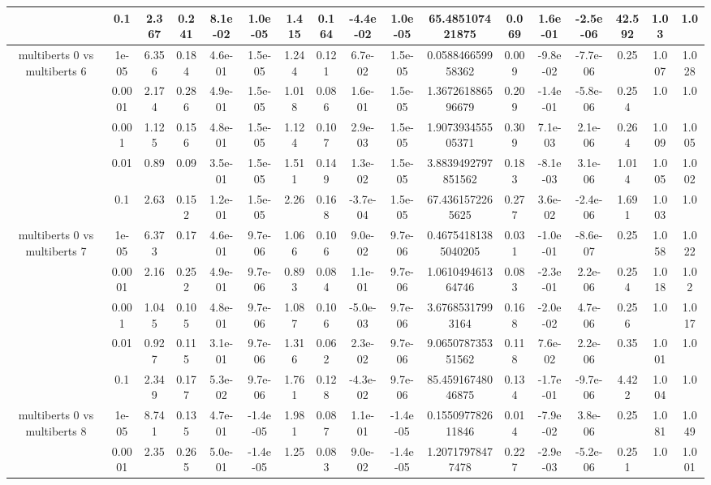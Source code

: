 \begin{tabular}{|c|c|c|c|c|c|c|c|c|c|c|c|c|c|c|c|c|}
 & 0.1 & 2.367 & 0.241 & 8.1e-02 & 1.0e-05 & 1.415 & 0.164 & -4.4e-02 & 1.0e-05 & 65.485107421875 & 0.069 & 1.6e-01 & -2.5e-06 & 42.592 & 1.03 & 1.0 \\
\hline
\multirow{5}{*}{multiberts 0 vs multiberts 6} & 1e-05 & 6.356 & 0.184 & 4.6e-01 & 1.5e-05 & 1.244 & 0.121 & 6.7e-02 & 1.5e-05 & 0.058846659958362 & 0.009 & -9.8e-02 & -7.7e-06 & 0.25 & 1.007 & 1.028 \\
 & 0.0001 & 2.174 & 0.286 & 4.9e-01 & 1.5e-05 & 1.018 & 0.086 & 1.6e-01 & 1.5e-05 & 1.367261886596679 & 0.209 & -1.4e-01 & -5.8e-06 & 0.254 & 1.0 & 1.0 \\
 & 0.001 & 1.125 & 0.156 & 4.8e-01 & 1.5e-05 & 1.124 & 0.107 & 2.9e-03 & 1.5e-05 & 1.907393455505371 & 0.309 & 7.1e-03 & 2.1e-06 & 0.264 & 1.009 & 1.005 \\
 & 0.01 & 0.89 & 0.09 & 3.5e-01 & 1.5e-05 & 1.511 & 0.149 & 1.3e-02 & 1.5e-05 & 3.8839492797851562 & 0.183 & -8.1e-03 & 3.1e-06 & 1.014 & 1.005 & 1.002 \\
 & 0.1 & 2.63 & 0.152 & 1.2e-01 & 1.5e-05 & 2.26 & 0.168 & -3.7e-04 & 1.5e-05 & 67.4361572265625 & 0.277 & 3.6e-02 & -2.4e-06 & 1.691 & 1.003 & 1.0 \\
\hline
\multirow{5}{*}{multiberts 0 vs multiberts 7} & 1e-05 & 6.373 & 0.17 & 4.6e-01 & 9.7e-06 & 1.066 & 0.106 & 9.0e-02 & 9.7e-06 & 0.46754181385040205 & 0.031 & -1.0e-01 & -8.6e-07 & 0.25 & 1.058 & 1.022 \\
 & 0.0001 & 2.16 & 0.252 & 4.9e-01 & 9.7e-06 & 0.893 & 0.084 & 1.1e-01 & 9.7e-06 & 1.061049461364746 & 0.083 & -2.3e-01 & 2.2e-06 & 0.254 & 1.018 & 1.02 \\
 & 0.001 & 1.045 & 0.105 & 4.8e-01 & 9.7e-06 & 1.087 & 0.106 & -5.0e-03 & 9.7e-06 & 3.67685317993164 & 0.168 & -2.0e-02 & 4.7e-06 & 0.256 & 1.0 & 1.017 \\
 & 0.01 & 0.927 & 0.115 & 3.1e-01 & 9.7e-06 & 1.316 & 0.062 & 2.3e-02 & 9.7e-06 & 9.065078735351562 & 0.118 & 7.6e-02 & 2.2e-06 & 0.35 & 1.001 & 1.0 \\
 & 0.1 & 2.349 & 0.177 & 5.3e-02 & 9.7e-06 & 1.761 & 0.128 & -4.3e-02 & 9.7e-06 & 85.45916748046875 & 0.134 & -1.7e-01 & -9.7e-06 & 4.422 & 1.004 & 1.0 \\
\hline
\multirow{5}{*}{multiberts 0 vs multiberts 8} & 1e-05 & 8.741 & 0.135 & 4.7e-01 & -1.4e-05 & 1.981 & 0.087 & 1.1e-01 & -1.4e-05 & 0.155097782611846 & 0.014 & -7.9e-02 & 3.8e-06 & 0.25 & 1.081 & 1.049 \\
 & 0.0001 & 2.35 & 0.265 & 5.0e-01 & -1.4e-05 & 1.25 & 0.083 & 9.0e-02 & -1.4e-05 & 1.20717978477478 & 0.227 & -2.9e-03 & -5.2e-06 & 0.251 & 1.0 & 1.001 \\

\end{tabular}
